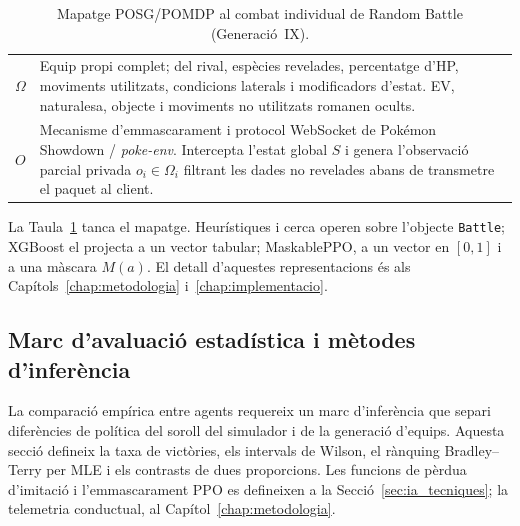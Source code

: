 \begin{table}[htbp]
\begin{tabularx}{\textwidth}{l>{\raggedright\arraybackslash}X}
        \arrayrulecolor{gray!30}\hline\arrayrulecolor{black}
        $\Omega$ & Equip propi complet; del rival, espècies revelades, percentatge d'HP, moviments utilitzats, condicions laterals i modificadors d'estat. EV, naturalesa, objecte i moviments no utilitzats romanen ocults. \\
        \arrayrulecolor{gray!30}\hline\arrayrulecolor{black}
        $O$      & Mecanisme d'emmascarament i protocol WebSocket de Pokémon Showdown / \textit{poke-env}. Intercepta l'estat global $S$ i genera l'observació parcial privada $o_i \in \Omega_i$ filtrant les dades no revelades abans de transmetre el paquet al client. \\
        \bottomrule
    \end{tabularx}
    \caption{Mapatge POSG/POMDP al combat individual de Random Battle (Generació~IX).}
    \label{tab:pomdp_pokemon}
\end{table}

La Taula~\ref{tab:pomdp_pokemon} tanca el mapatge. Heurístiques i cerca operen sobre l'objecte \texttt{Battle}; XGBoost el projecta a un vector tabular; MaskablePPO, a un vector en $[0,1]$ i a una màscara $M(a)$. El detall d'aquestes representacions és als Capítols~\ref{chap:metodologia} i~\ref{chap:implementacio}.

\subsection{Marc d'avaluació estadística i mètodes d'inferència}
\label{subsec:marc_estadistic}

La comparació empírica entre agents requereix un marc d'inferència que separi diferències de política del soroll del simulador i de la generació d'equips. Aquesta secció defineix la taxa de victòries, els intervals de Wilson, el rànquing Bradley--Terry per MLE i els contrasts de dues proporcions. Les funcions de pèrdua d'imitació i l'emmascarament PPO es defineixen a la Secció~\ref{sec:ia_tecniques}; la telemetria conductual, al Capítol~\ref{chap:metodologia}.

